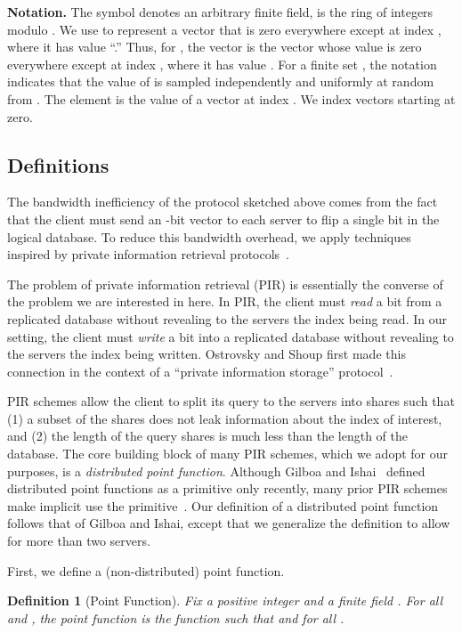 \documentclass[10pt,twocolumn]{article}
\newtheorem{defn}{Definition}
\newcommand{\nicepara}[1]{\medskip\noindent\textbf{#1.}}
\begin{document}
\nicepara{Notation}
The symbol  denotes an arbitrary finite field,
 is the ring of integers modulo .
We use  to represent a vector 
that is zero everywhere except at index ,
where it has value ``.''
Thus, for , the vector  is the 
vector whose value is zero everywhere except at index , where it
has value .
For a finite set , the notation  indicates
that the value of  is sampled independently and uniformly at random
from .
The element  is the value of
a vector  at index .
We index vectors starting at zero.


\subsection{Definitions}
The bandwidth inefficiency of the protocol sketched above comes from the
fact that the client must send an -bit vector
to each server to flip a single bit in the logical database.
To reduce this  bandwidth overhead, we apply techniques inspired
by private information retrieval 
protocols~\cite{chor1997computationally,chor1998private,gilboa2014distributed}.

The problem of private information retrieval (PIR) is essentially the converse
of the problem we are interested in here.
In PIR, the client must {\em read} 
a bit from a replicated database without revealing to 
the servers the index being read.
In our setting, the client must {\em write}
a bit into a replicated database without revealing to the servers the
index being written.
Ostrovsky and Shoup first made this
connection in the context of a ``private information storage'' protocol~\cite{ostrovsky1997private}.

PIR schemes allow the client to split its query to the servers 
into shares such that  
(1) a subset of the shares does not leak information about the index of interest, and
(2) the length of the query shares is much less than the length of the database.
The core building block of many PIR schemes, which we adopt
for our purposes, is a {\em distributed point function}.
Although Gilboa and Ishai~\cite{gilboa2014distributed}
defined distributed point functions 
as a primitive only recently, many prior PIR schemes make implicit
use the primitive~\cite{chor1997computationally,chor1998private}.
Our definition of a distributed point function
follows that of Gilboa and Ishai, except
that we generalize the definition to allow 
for more than two servers.

First, we define a (non-distributed) point function.

\begin{defn}[Point Function]
Fix a positive integer  and a finite field .
For all  and , the {\em point function} 
is the function such that  and  for
all .
\end{defn}
\end{document}
